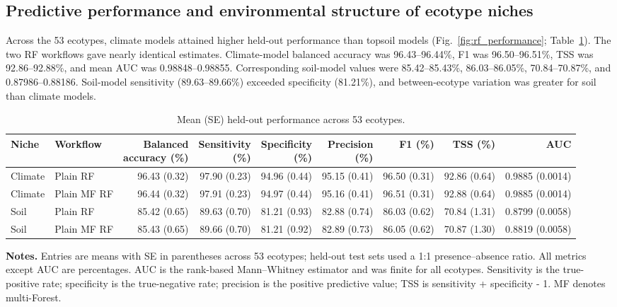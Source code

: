 \documentclass[11pt]{article}
\begin{document}
\subsection{Predictive performance and environmental structure of ecotype niches}

Across the 53 ecotypes, climate models attained higher held-out performance
than topsoil models (Fig.~\ref{fig:rf_performance};
Table~\ref{tab:rf_overall_final}). The two RF workflows gave nearly identical
estimates. Climate-model balanced accuracy was 96.43--96.44\%, F1 was
96.50--96.51\%, TSS was 92.86--92.88\%, and mean AUC was
0.98848--0.98855. Corresponding soil-model values were 85.42--85.43\%,
86.03--86.05\%, 70.84--70.87\%, and 0.87986--0.88186. Soil-model sensitivity
(89.63--89.66\%) exceeded specificity (81.21\%), and between-ecotype
variation was greater for soil than climate models.

\begin{table}[!htbp]
\centering
\caption{Mean (SE) held-out performance across 53 ecotypes.}
\label{tab:rf_overall_final}
\begin{threeparttable}
\centering
\scriptsize
\setlength{\tabcolsep}{2.0pt}
\begin{tabular}{@{}llrrrrrrr@{}}
\toprule
Niche & Workflow &
\shortstack{Balanced\\accuracy (\%)} &
\shortstack{Sensitivity\\(\%)} &
\shortstack{Specificity\\(\%)} &
\shortstack{Precision\\(\%)} &
F1 (\%) &
TSS (\%) &
AUC \\
\midrule
Climate & Plain RF    & 96.43 (0.32) & 97.90 (0.23) & 94.96 (0.44) & 95.15 (0.41) & 96.50 (0.31) & 92.86 (0.64) & 0.9885 (0.0014) \\
Climate & Plain MF RF & 96.44 (0.32) & 97.91 (0.23) & 94.97 (0.44) & 95.16 (0.41) & 96.51 (0.31) & 92.88 (0.64) & 0.9885 (0.0014) \\
\addlinespace
Soil & Plain RF       & 85.42 (0.65) & 89.63 (0.70) & 81.21 (0.93) & 82.88 (0.74) & 86.03 (0.62) & 70.84 (1.31) & 0.8799 (0.0058) \\
Soil & Plain MF RF    & 85.43 (0.65) & 89.66 (0.70) & 81.21 (0.92) & 82.89 (0.73) & 86.05 (0.62) & 70.87 (1.30) & 0.8819 (0.0058) \\
\bottomrule
\end{tabular}
\begin{tablenotes}[flushleft]
\footnotesize
\item[] \textbf{Notes.} Entries are means with SE in parentheses across 53
ecotypes; held-out test sets used a 1:1 presence--absence ratio. All metrics
except AUC are percentages. AUC is the rank-based Mann--Whitney estimator and
was finite for all ecotypes. Sensitivity is the true-positive rate;
specificity is the true-negative rate; precision is the positive predictive
value; TSS is sensitivity + specificity - 1. MF denotes multi-Forest.
\end{tablenotes}
\end{threeparttable}
\end{table}
\end{document}
